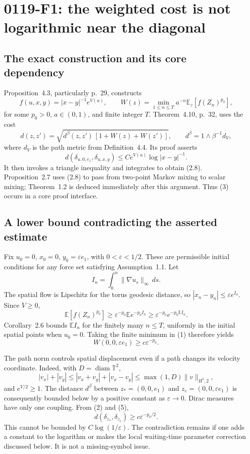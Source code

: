 \documentclass[10pt]{article}
\begin{document}
\section*{0119-F1: the weighted cost is not logarithmic near the diagonal}
\subsection*{The exact construction and its core dependency}
Proposition 4.3, particularly p. 29, constructs \[f(u,x,y)=|x-y|^{-1}e^{V(u)},\qquad
 W(z)=\min_{1\le n\le T}a^{-n}\mathbb E_z[f(Z_n)^{p_0}],
 \tag{1}\] for some \(p_0>0\), \(a\in(0,1)\), and finite integer \(T\). Theorem 4.10, p. 32, uses the cost \[d(z,z')=
 \sqrt{d^\beta(z,z')\,[1+W(z)+W(z')]},\qquad
 d^\beta=1\wedge\beta^{-1}d_V,
 \tag{2}\] where \(d_V\) is the path metric from Definition 4.4. Its proof asserts \[d(\delta_{u,0,e_1},\delta_{u,x,y})
 \le Ce^{V(u)}\log|x-y|^{-1}.
 \tag{3}\] It then invokes a triangle inequality and integrates to obtain (2.8). Proposition 2.7 uses (2.8) to pass from two-point Markov mixing to scalar mixing; Theorem 1.2 is deduced immediately after this argument. Thus (3) occurs in a core proof interface.\par
\subsection*{A lower bound contradicting the asserted estimate}
Fix \(u_0=0\), \(x_0=0\), \(y_0=\varepsilon e_1\), with \(0<\varepsilon<1/2\). These are permissible initial conditions for any force set satisfying Assumption 1.1. Let \[I_n=\int_0^n\|\nabla u_s\|_\infty\,ds.\] The spatial flow is Lipschitz for the torus geodesic distance, so \(|x_n-y_n|\le\varepsilon e^{I_n}\). Since \(V\ge0\), \[\mathbb E[f(Z_n)^{p_0}]
 \ge \varepsilon^{-p_0}\mathbb E e^{-p_0I_n}
 \ge \varepsilon^{-p_0}e^{-p_0\mathbb E I_n}.
 \tag{4}\] Corollary 2.6 bounds \(\mathbb E I_n\) for the finitely many \(n\le T\), uniformly in the initial spatial points when \(u_0=0\). Taking the finite minimum in (1) therefore yields \[W(0,0,\varepsilon e_1)\ge c\varepsilon^{-p_0}.
 \tag{5}\]\par
The path norm controls spatial displacement even if a path changes its velocity coordinate. Indeed, with \(D=\operatorname{diam}\mathbb T^2\), \[|v_x|+|v_y|
 \le |v_x+v_y|+|v_x-v_y|
 \le \max(1,D)\|v\|_{H^5,2},\] and \(e^{V/2}\ge1\). The distance \(d^\beta\) between \(z_*=(0,0,e_1)\) and \(z_\varepsilon=(0,0,\varepsilon e_1)\) is consequently bounded below by a positive constant as \(\varepsilon\to0\). Dirac measures have only one coupling. From (2) and (5), \[d(\delta_{z_*},\delta_{z_\varepsilon})
 \ge c\varepsilon^{-p_0/2}.
 \tag{6}\] This cannot be bounded by \(C\log(1/\varepsilon)\). The contradiction remains if one adds a constant to the logarithm or makes the local waiting-time parameter correction discussed below. It is not a missing-symbol issue.\par
\end{document}
